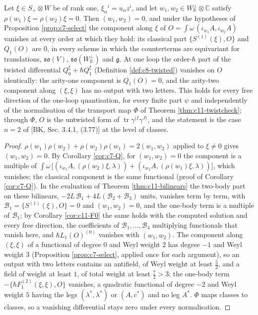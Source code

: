 \begin{proposition}
\label{prop:c11-plane}
Let $\xi\in S_+\otimes W$ be of rank one, $\xi_\alpha{}^i=u_\alpha z^i$, and let $w_1,w_2\in W_{\mathbb R}^\perp\otimes\mathbb C$ satisfy $\rho(w_1)\xi=\rho(w_2)\xi=0$. Then $(w_1,w_2)=0$, and under the hypotheses of Proposition \ref{prop:c7-select} the component along $\xi$ of $O=\int\omega\,(\iota_{w_1}A,\iota_{w_2}A)$ vanishes at every order at which they hold: its classical part $\{S^{(1)}(\xi),O\}$ and $Q_1(O)$ are $0$, in every scheme in which the counterterms are equivariant for translations, $\mathfrak{so}(V)$, $\mathfrak{so}(W_{\mathbb R}^\perp)$ and $\mathfrak g$. At one loop the order-$\hbar$ part of the twisted differential $Q^\xi_0+\hbar Q^\xi_1$ (Definition \ref{def:c8-twisted}) vanishes on $O$ identically: the arity-one component is $Q_1(O)=0$, and the arity-two component along $(\xi,\xi)$ has no output with two letters. This holds for every free direction of the one-loop quantisation, for every finite part $\psi$ and independently of the normalisation of the transport map $\Phi$ of Theorem \ref{thm:c11-twistcheck}; through $\Phi$, $O$ is the untwisted form of $\operatorname{tr}\gamma^{(I}\gamma^{J)}$, and the statement is the case $n=2$ of [BK, Sec. 3.4.1, (3.77)] at the level of classes.
\end{proposition}

\begin{proof}
$\rho(w_1)\rho(w_2)+\rho(w_2)\rho(w_1)=2(w_1,w_2)$ applied to $\xi\ne0$ gives $(w_1,w_2)=0$. By Corollary \ref{cor:c7-Q}, for $(w_1,w_2)=0$ the component is a multiple of $\int\omega\,\big[(\iota_{w_1}A,(\rho(w_2)\xi,\lambda))+(\iota_{w_2}A,(\rho(w_1)\xi,\lambda))\big]$, which vanishes; the classical component is the same functional (proof of Corollary \ref{cor:c7-Q}). In the evaluation of Theorem \ref{thm:c11-bilinears} the two-body part on these bilinears, $-2L\,\mathcal B_1+4L(\mathcal B_2+\mathcal B_3)$ units, vanishes term by term, with $\mathcal B_1=\{S^{(1)}(\xi),O\}=0$ and $(w_1,w_2)=0$, and the one-body term is a multiple of $\mathcal B_1$; by Corollary \ref{cor:c11-F0} the same holds with the computed solution and every free direction, the coefficients of $\mathcal B_1,\dots,\mathcal B_4$ multiplying functionals that vanish here, and $\hbar L_1(O)^{(0)}$ vanishes with $(w_1,w_2)$. The component along $(\xi,\xi)$ of a functional of degree $0$ and Weyl weight $2$ has degree $-1$ and Weyl weight $3$ (Proposition \ref{prop:c7-select}, applied once for each argument), so an output with two letters contains an antifield, of Weyl weight at least $\tfrac52$, and a field of weight at least $1$, of total weight at least $\tfrac72>3$; the one-body term $-\{\hbar F_1^{(2)}(\xi,\xi),O\}$ vanishes, a quadratic functional of degree $-2$ and Weyl weight $5$ having the legs $(\lambda^*,\lambda^*)$ or $(A,c^*)$ and no leg $A^*$. $\Phi$ maps classes to classes, so a vanishing differential stays zero under every normalisation.
\end{proof}


